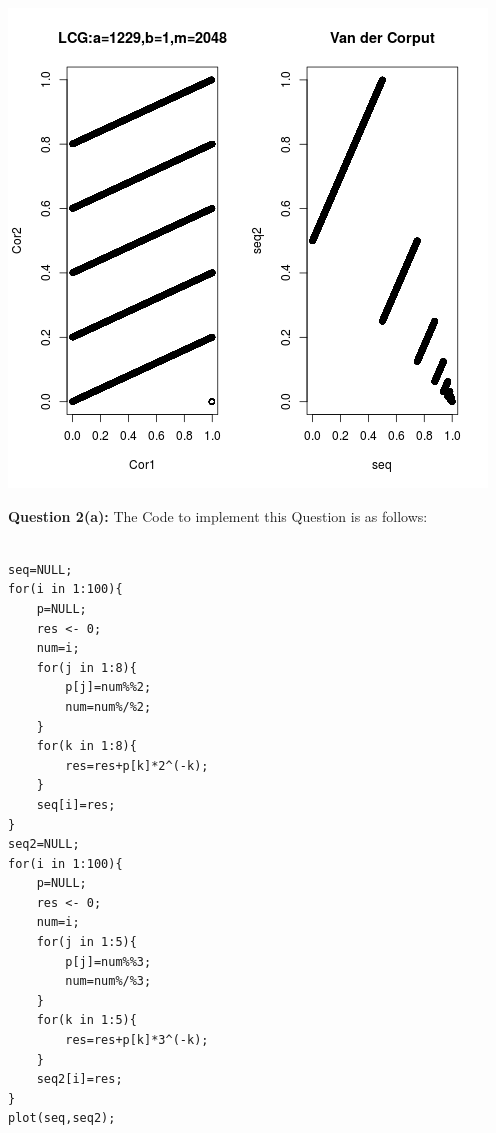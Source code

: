 \documentclass{article}
\begin{document}
\begin{center}
	\includegraphics{Question1_6.png}
\end{center}
\newpage
\textbf{\large Question 2(a):}
The Code to implement this Question is as follows:\\


\lstset {language=R}


\begin{lstlisting}

seq=NULL;
for(i in 1:100){
	p=NULL;
	res <- 0;
	num=i;
	for(j in 1:8){
		p[j]=num%%2;
		num=num%/%2;
	}
	for(k in 1:8){
		res=res+p[k]*2^(-k);
	}
	seq[i]=res;
}
seq2=NULL;
for(i in 1:100){
	p=NULL;
	res <- 0;
	num=i;
	for(j in 1:5){
		p[j]=num%%3;
		num=num%/%3;
	}
	for(k in 1:5){
		res=res+p[k]*3^(-k);
	}
	seq2[i]=res;
}
plot(seq,seq2);


\end{lstlisting}
\end{document}
